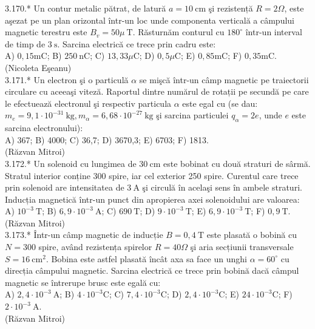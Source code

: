 3.170.* Un contur metalic pătrat, de latură $a=10 \mathrm{~cm}$ şi rezistență $R=2 \Omega$, este aşezat pe un plan orizontal într-un loc unde componenta verticală a câmpului magnetic terestru este $B_{v}=50 \mu \mathrm{~T}$. Răsturnăm conturul cu $180^{\circ}$ într-un interval de timp de $3 \mathrm{~s}$. Sarcina electrică ce trece prin cadru este:\\ A) $0,15 \mathrm{mC}$; B) $250 \mathrm{~nC}$; C) $13,33 \mu \mathrm{C}$; D) $0,5 \mu \mathrm{C}$; E) $0,85 \mathrm{mC}$; F) $0,35 \mathrm{mC}$.\\ (Nicoleta Eşeanu)\\

3.171.* Un electron şi o particulă $\alpha$ se mişcă într-un câmp magnetic pe traiectorii circulare cu aceeaşi viteză. Raportul dintre numărul de rotații pe secundă pe care le efectuează electronul şi respectiv particula $\alpha$ este egal cu (se dau: $m_{e}=9,1 \cdot 10^{-31} \mathrm{~kg}, m_{\alpha}=6,68 \cdot 10^{-27} \mathrm{~kg}$ şi sarcina particulei $q_{\alpha}=2 e$, unde $e$ este sarcina electronului):\\ A) 367; B) 4000; C) 36,7; D) 3670,3; E) 6703; F) 1813.\\ (Răzvan Mitroi)\\

3.172.* Un solenoid cu lungimea de $30 \mathrm{~cm}$ este bobinat cu două straturi de sârmă. Stratul interior conține 300 spire, iar cel exterior 250 spire. Curentul care trece prin solenoid are intensitatea de $3 \mathrm{~A}$ şi circulă în acelaşi sens în ambele straturi. Inducția magnetică într-un punct din apropierea axei solenoidului are valoarea:\\ A) $10^{-3} \mathrm{~T}$; B) $6,9 \cdot 10^{-3} \mathrm{~A}$; C) $690 \mathrm{~T}$; D) $9 \cdot 10^{-3} \mathrm{~T}$; E) $\left.6,9 \cdot 10^{-3} \mathrm{~T}$; F) $0,9 \mathrm{~T}$.\\ (Răzvan Mitroi)\\

3.173.* Într-un câmp magnetic de inducție $B=0,4 \mathrm{~T}$ este plasată o bobină cu $N=300$ spire, având rezistența spirelor $R=40 \Omega$ şi aria secțiunii transversale $S=16 \mathrm{~cm}^{2}$. Bobina este astfel plasată încât axa sa face un unghi $\alpha=60^{\circ}$ cu direcția câmpului magnetic. Sarcina electrică ce trece prin bobină dacă câmpul magnetic se întrerupe brusc este egală cu:\\ A) $2,4 \cdot 10^{-3} \mathrm{~A}$; B) $4 \cdot 10^{-3} \mathrm{C}$; C) $7,4 \cdot 10^{-3} \mathrm{C}$; D) $2,4 \cdot 10^{-3} \mathrm{C}$; E) $24 \cdot 10^{-3} \mathrm{C}$; F) $2 \cdot 10^{-3} \mathrm{~A}$.\\ (Răzvan Mitroi)\\

